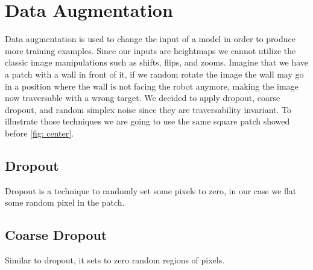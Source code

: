 \documentclass[../document.tex]{subfiles}
\begin{document}
\section{Data Augmentation}
\label{sec: data-aug}
Data augmentation is used to change the input of a model in order to produce more training examples. Since our inputs are heightmaps we cannot utilize the classic image manipulations such as shifts, flips, and zooms. Imagine that we have a patch with a wall in front of it, if we random rotate the image the wall may go in a position where the wall is not facing the robot anymore, making the image now traversable with a wrong target. We decided to apply dropout, coarse dropout, and random simplex noise since they are traversability invariant. To illustrate those techniques we are going to use the same square patch showed before \ref{fig: center}.

\subsection{Dropout}
Dropout is a technique to randomly set some pixels to zero, in our case we flat some random pixel in the patch. 
\subsection{Coarse Dropout}
Similar to dropout, it sets to zero random regions of pixels.
\end{document}
